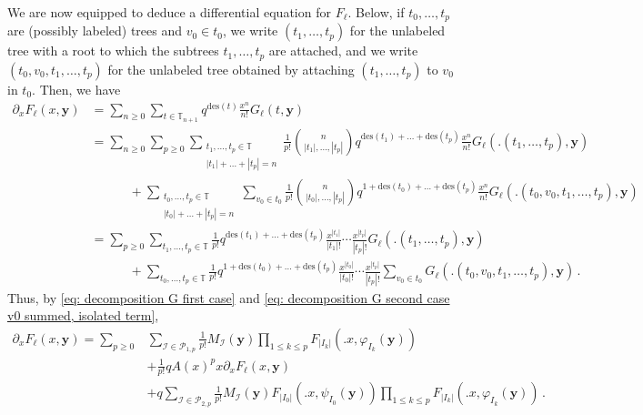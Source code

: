 \documentclass{article}
\theoremstyle{remark}
\newcommand{\bT}{\mathbb{T}}
\newcommand{\abs}[1]{{\left|#1\right|}}
\newcommand{\cI}{\mathcal{I}}
\newcommand{\cP}{\mathcal{P}}
\newcommand{\by}{{\mathbf{y}}}
\newcommand{\des}[1]{{\mathrm{des}{\left(#1\right)}}}
\begin{document}
\medskip

We are now equipped to deduce a differential equation for $F_\ell$.
Below, if $t_0,\dots,t_p$ are (possibly labeled) trees and $v_0\in t_0$, we write $(t_1, \dots, t_p)$ for the unlabeled tree with a root to which the subtrees $t_1, \dots, t_p$ are attached, and we write $(t_0, v_0, t_1, \dots, t_p)$ for the unlabeled tree obtained by attaching $(t_1, \dots, t_p)$ to $v_0$ in $t_0$.
Then, we have
\begin{align*}
    \partial_x F_\ell(x,\by)
    &= \sum_{n\ge0} \sum_{t\in\bT_{n+1}} q^\des{t} \frac{x^n}{n!} G_\ell(t,\by) \\
    &= \sum_{n\ge0} \sum_{p\ge0} \sum_{\substack{t_1, \dots, t_p\in \bT\\ \abs{t_1}+\dots+\abs{t_p}=n}}
    \frac{1}{p!} \binom{n}{\abs{t_1},\dots,\abs{t_p}} q^{\des{t_1}+\dots+\des{t_p}} \frac{x^n}{n!} G_\ell\left(\big.(t_1,\dots,t_p), \by\right) \\
    &\hspace{3em} + \sum_{\substack{t_0, \dots, t_p\in\bT\\ \abs{t_0}+\dots+\abs{t_p}=n}}
    \sum_{v_0\in t_0} \frac{1}{p!} \binom{n}{\abs{t_0},\dots,\abs{t_p}} q^{1+\des{t_0}+\dots+\des{t_p}} \frac{x^n}{n!} G_\ell\left(\big.(t_0,v_0,t_1,\dots,t_p), \by\right) \\
    &= \sum_{p\ge0} \sum_{t_1, \dots, t_p\in \bT} \frac{1}{p!} q^{\des{t_1}+\dots+\des{t_p}} \frac{x^{\abs{t_1}}}{\abs{t_1}!} \cdots \frac{x^{\abs{t_p}}}{\abs{t_p}!} G_\ell\left(\big.(t_1,\dots,t_p), \by\right) \\
    &\hspace{3em} + \sum_{t_0, \dots, t_p\in\bT} \frac{1}{p!} q^{1+\des{t_0}+\dots+\des{t_p}} \frac{x^{\abs{t_0}}}{\abs{t_0}!} \cdots \frac{x^{\abs{t_p}}}{\abs{t_p}!} \sum_{v_0\in t_0} G_\ell\left(\big.(t_0,v_0,t_1,\dots,t_p), \by\right) \,.
\end{align*}
Thus, by \eqref{eq: decomposition G first case} and \eqref{eq: decomposition G second case v0 summed, isolated term},
\begin{align}\label{eq: equadiff on Fell before reduced}
    \partial_x F_\ell(x,\by)
    = \sum_{p\ge0} &\sum_{\cI\in \cP_{1,p}} \frac{1}{p!} 
    M_\cI(\by)
    \prod_{1\le k\le p} F_{\abs{I_k}}\left(\big. x , \varphi_{I_k}(\by) \right) \nonumber\\
    &+ \frac{1}{p!} q A(x)^p x \partial_x F_\ell(x,\by) \nonumber\\
    &+ q \sum_{\cI\in \cP_{2,p}} 
    \frac{1}{p!}
    M_\cI(\by)
    F_{\abs{I_0}}\left(\big. x , \psi_{I_0}(\by) \right)
    \prod_{1\le k\le p} F_{\abs{I_k}}\left(\big. x , \varphi_{I_k}(\by) \right) \,.
\end{align}
\end{document}
